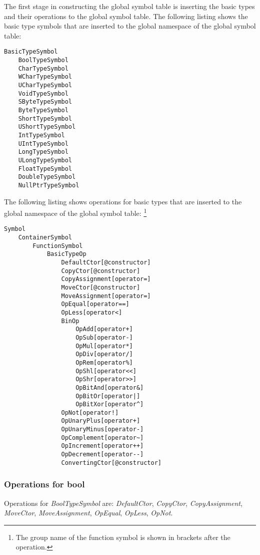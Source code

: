 \documentclass[a4paper,oneside,11pt]{book}
\theoremstyle{definition}
\begin{document}
The first stage in constructing the global symbol table is inserting the basic types and their operations to the global symbol table.
The following listing shows the basic type symbols that are inserted to the global namespace of the global symbol table:

\begin{verbatim}
BasicTypeSymbol
    BoolTypeSymbol
    CharTypeSymbol
    WCharTypeSymbol
    UCharTypeSymbol
    VoidTypeSymbol
    SByteTypeSymbol
    ByteTypeSymbol
    ShortTypeSymbol
    UShortTypeSymbol
    IntTypeSymbol
    UIntTypeSymbol
    LongTypeSymbol
    ULongTypeSymbol
    FloatTypeSymbol
    DoubleTypeSymbol
    NullPtrTypeSymbol
\end{verbatim}

The following listing shows operations for basic types that are inserted to the global namespace of the global symbol table:
\footnote{The group name of the function symbol is shown in brackets after the operation.}

\begin{verbatim}
Symbol
    ContainerSymbol
        FunctionSymbol
            BasicTypeOp
                DefaultCtor[@constructor]
                CopyCtor[@constructor]
                CopyAssignment[operator=]
                MoveCtor[@constructor]
                MoveAssignment[operator=]
                OpEqual[operator==]
                OpLess[operator<]
                BinOp
                    OpAdd[operator+]
                    OpSub[operator-]
                    OpMul[operator*]
                    OpDiv[operator/]
                    OpRem[operator%]
                    OpShl[operator<<]
                    OpShr[operator>>]
                    OpBitAnd[operator&]
                    OpBitOr[operator|]
                    OpBitXor[operator^]
                OpNot[operator!]
                OpUnaryPlus[operator+]
                OpUnaryMinus[operator-]
                OpComplement[operator~]
                OpIncrement[operator++]
                OpDecrement[operator--]
                ConvertingCtor[@constructor]
\end{verbatim}

\subsubsection{Operations for \textbf{bool}}

Operations for \emph{BoolTypeSymbol} are: \emph{DefaultCtor}, \emph{CopyCtor}, \emph{CopyAssignment}, \emph{MoveCtor}, \emph{MoveAssignment},
\emph{OpEqual}, \emph{OpLess}, \emph{OpNot}.
\end{document}
